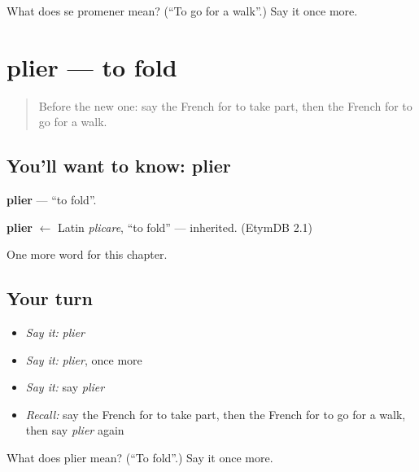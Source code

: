 \begin{tcolorbox}[breakable,colback=teal!4,colframe=teal!35!black,title={Before you move on}]
What does se promener mean? (\textquotedblleft{}To go for a walk\textquotedblright{}.) Say it once more.
\end{tcolorbox}
\section[plier]{plier — to fold}

\label{lesson:FR-C148-plier}



\begin{quote}
Before the new one: say the French for to take part, then the French for to go for a walk.
\end{quote}

\subsection*{You'll want to know: plier}
\textbf{plier} — \textquotedblleft{}to fold\textquotedblright{}.

\begin{cousinweb}
\textbf{plier} $\leftarrow$ Latin \emph{plicare}, \textquotedblleft{}to fold\textquotedblright{} — inherited. (EtymDB 2.1)
\end{cousinweb}

\begin{grammarlens}[title={What you've built}]
One more word for this chapter.
\end{grammarlens}

\subsection*{Your turn}
\begin{itemize}
\raggedright
  \item \emph{Say it:} \emph{plier}
  \item \emph{Say it:} \emph{plier}, once more
  \item \emph{Say it:} say \emph{plier}
  \item \emph{Recall:} say the French for to take part, then the French for to go for a walk, then say \emph{plier} again
\end{itemize}

\begin{tcolorbox}[breakable,colback=teal!4,colframe=teal!35!black,title={Before you move on}]
What does plier mean? (\textquotedblleft{}To fold\textquotedblright{}.) Say it once more.
\end{tcolorbox}
